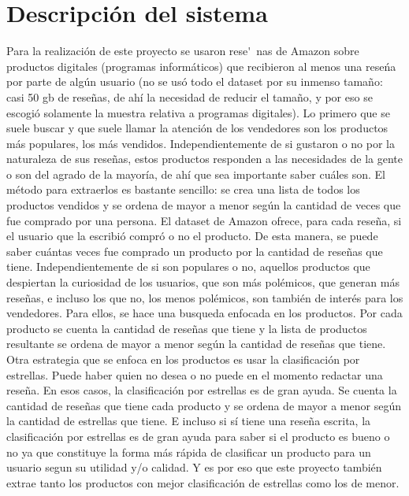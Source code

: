 \documentclass{llncs}
\begin{document}
\section{Descripci\'on del sistema}
    Para la realizaci\'on de este proyecto se usaron rese\'~nas de Amazon sobre productos digitales (programas inform\'aticos) que recibieron al menos una rese\'na por parte de alg\'un usuario (no se us\'o todo el dataset por su inmenso tama\~no: casi 50 gb de rese\~nas, de ah\'i la necesidad de reducir el tama\~no, y por eso se escogi\'o solamente la muestra relativa a programas digitales).
    Lo primero que se suele buscar y que suele llamar la atenci\'on de los vendedores son los productos m\'as populares, los m\'as vendidos. Independientemente de si gustaron o no por la naturaleza de sus rese\~nas, estos productos responden a las necesidades de la gente o son del agrado de la mayor\'ia, de ah\'i que sea importante saber cu\'ales son. El m\'etodo para extraerlos es bastante sencillo: se crea una lista de todos los productos vendidos y se ordena de mayor a menor seg\'un la cantidad de veces que fue comprado por una persona. El dataset de Amazon ofrece, para cada rese\~na, si el usuario que la escribi\'o compr\'o o no el producto. De esta manera, se puede saber cu\'antas veces fue comprado un producto por la cantidad de rese\~nas que tiene.
    Independientemente de si son populares o no, aquellos productos que despiertan la curiosidad de los usuarios, que son m\'as pol\'emicos, que generan m\'as rese\~nas, e incluso los que no, los menos pol\'emicos, son tambi\'en de inter\'es para los vendedores. Para ellos, se hace una busqueda enfocada en los productos. Por cada producto se cuenta la cantidad de rese\~nas que tiene y la lista de productos resultante se ordena de mayor a menor seg\'un la cantidad de rese\~nas que tiene.
    Otra estrategia que se enfoca en los productos es usar la clasificaci\'on por estrellas. Puede haber quien no desea o no puede en el momento redactar una rese\~na. En esos casos, la clasificaci\'on por estrellas es de gran ayuda. Se cuenta la cantidad de rese\~nas que tiene cada producto y se ordena de mayor a menor seg\'un la cantidad de estrellas que tiene. E incluso si s\'i tiene una rese\~na escrita, la clasificaci\'on por estrellas es de gran ayuda para saber si el producto es bueno o no ya que constituye la forma m\'as r\'apida de clasificar un producto para un usuario segun su utilidad y/o calidad. Y es por eso que este proyecto tambi\'en extrae tanto los productos con mejor clasificaci\'on de estrellas como los de menor.
\end{document}

